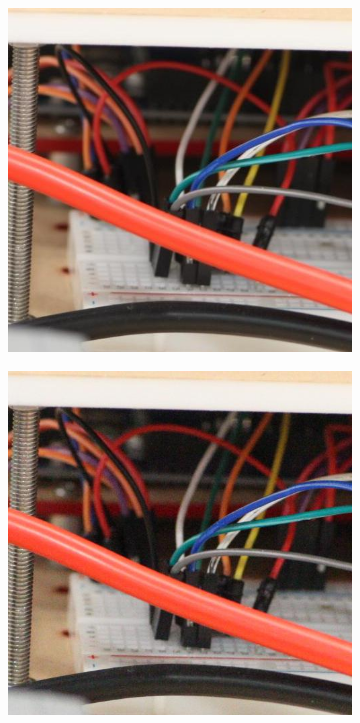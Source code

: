 \begin{figure}
\begin{subfigure}[t]{0.24\textwidth}
    \end{subfigure}   
\hfill
    \begin{subfigure}[t]{0.24\textwidth}
        \centering
        \includegraphics[width=1\textwidth]{images/dataset/Canon5D2_5_160_6400_circuit_11_mean.JPG}
    \end{subfigure}
\hfill
    \begin{subfigure}[t]{0.24\textwidth}
        \centering
        \includegraphics[width=1\textwidth]{images/dataset/Canon5D2_5_160_6400_circuit_11_real.JPG}
    \end{subfigure}


\end{figure}
